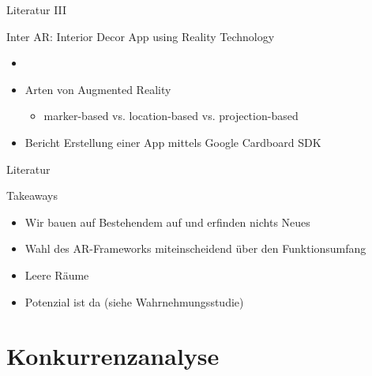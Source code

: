 \documentclass[presentation,bigger,aspectratio=169]{beamer}
\begin{document}
\begin{frame}[label={sec:org41f483b}]{Literatur III}
\begin{block}{Inter AR: Interior Decor App using Reality Technology}
\begin{itemize}
\item \textcite{moaresInterARInterior2020}
\item Arten von Augmented Reality
\begin{itemize}
\item marker-based vs. location-based vs. projection-based
\end{itemize}
\item Bericht Erstellung einer App mittels Google Cardboard SDK
\end{itemize}
\end{block}
\end{frame}

\begin{frame}[label={sec:org3e5f03a}]{Literatur}
\begin{block}{Takeaways}
\begin{itemize}
\item Wir bauen auf Bestehendem auf und erfinden nichts Neues
\item Wahl des AR-Frameworks miteinscheidend über den Funktionsumfang
\item Leere Räume
\item Potenzial ist da (siehe Wahrnehmungsstudie)
\end{itemize}
\end{block}
\end{frame}

\section{Konkurrenzanalyse}
\label{sec:org4aae12e}
\begin{frame}[label={sec:orgf91b76d}]{\vspace{2.2cm}\begin{center}\MakeUppercase{\insertsection}\end{center}}
\end{frame}
\end{document}
